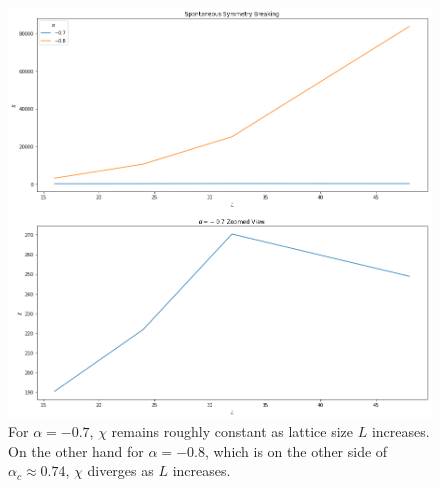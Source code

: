 \documentclass[12]{report}
\newcommand\0{\mathbf{0}}
\newcommand\<{\langle}
\renewcommand\>{\rangle}
\begin{document}
\begin{figure}[H]
\label{fig:sym}
\centering
\includegraphics[width=\textwidth]{symmetry}
\caption{For $\alpha = -0.7$, $\chi$ remains roughly constant as lattice size $L$ increases. On the other hand for $\alpha = -0.8$, which is on the other side of $\alpha_c \approx 0.74$, $\chi$ diverges as $L$ increases.}		
\end{figure}
\end{document}
